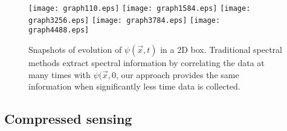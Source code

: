 \documentclass[10pt]{amsart}
\theoremstyle{remark}
\begin{document}
\begin{figure}
\begin{center}
\texttt{[image: graph110.eps]}
\texttt{[image: graph1584.eps]}
\texttt{[image: graph3256.eps]}
\texttt{[image: graph3784.eps]}
\texttt{[image: graph4488.eps]}
\caption{Snapshots of evolution of $\psi(\vec{x},t)$ in a 2D box. Traditional spectral methods extract spectral information by correlating the data at many times with $\psi(\vec{x},0$, our approach provides the same information when significantly less time data is collected.}
\end{center}
\end{figure}

\subsection{Compressed sensing}
\end{document}
